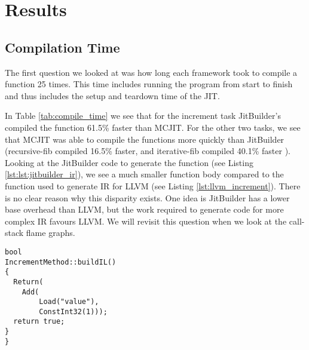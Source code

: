 \section{Results}
\label{sec:results}
\subsection{Compilation Time}
The first question we looked at was how long each framework took to compile a function 25 times. This time includes running the program from start to finish and thus includes the setup and teardown time of the JIT.

In Table \ref{tab:compile_time} we see that for the increment task JitBuilder's compiled the function 61.5\% faster than MCJIT.
For the other two tasks, we see that MCJIT was able to compile the functions more quickly than JitBuilder (recursive-fib compiled 16.5\% faster, and iterative-fib compiled 40.1\% faster ).
Looking at the JitBuilder code to generate the function (see Listing \ref{lst:lst:jitbuilder_ir}), we see a much smaller function body compared to the function used to generate IR for LLVM (see Listing \ref{lst:llvm_increment}).
There is no clear reason why this disparity exists.
One idea is JitBuilder has a lower base overhead than LLVM, but the work required to generate code for more complex IR favours LLVM.
We will revisit this question when we look at the call-stack flame graphs.

\begin{lstlisting}[float,floatplacement=H,
caption={Generating JitBuilder IR for the increment program.},
label=lst:jitbuilder_increment]
bool
IncrementMethod::buildIL()
{
  Return(
    Add(
        Load("value"),
        ConstInt32(1)));
  return true;
}
}\end{lstlisting}


